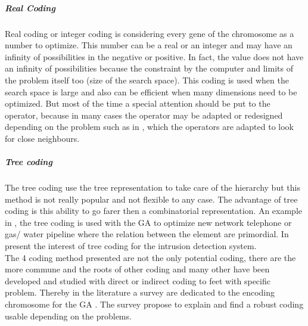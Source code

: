 \subparagraph*{Real Coding }%
Real coding or integer coding is considering every gene of the chromosome as a number to optimize. This number can be a real or an integer and may have an infinity of possibilities in the negative or positive. In fact, the value does not have an infinity of possibilities because the constraint by the computer and limits of the problem itself too (size of the search space). This coding is used when the search space is large and also can be efficient when many dimensions need to be optimized. But most of the time a special attention should be put to the operator, because in many cases the operator may be adapted or redesigned depending on the problem such as in \cite{68*muhlenbein1989},  which the operators are adapted to look for close neighbours.\\
\subparagraph*{Tree coding }%
The tree coding use the tree representation to take care of the hierarchy but this method is not really popular and not flexible to any case. The advantage of tree coding is this ability to go farer then a combinatorial representation.  An example in \cite{131*walters1995}, the tree coding is used with the GA to optimize new network telephone or gas/ water pipeline where the relation between the element are primordial. In \cite{131*walters1995} present the interest of tree coding for  the intrusion detection system. 
\\
The 4 coding method presented are not the only potential coding, there are the more commune and the roots of other coding   and many other have been developed and studied with direct or indirect coding to feet  with specific problem. Thereby in the literature a survey are dedicated to the encoding chromosome for the GA \cite{121*ronald1997}. The survey \cite{121*ronald1997} propose to explain and find a robust coding usable depending on the problems. 
\\




